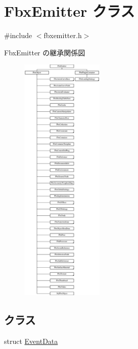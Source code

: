 \hypertarget{class_fbx_emitter}{}\section{Fbx\+Emitter クラス}
\label{class_fbx_emitter}


{\ttfamily \#include $<$fbxemitter.\+h$>$}

Fbx\+Emitter の継承関係図\begin{figure}[H]
\begin{center}
\leavevmode
\includegraphics[height=12.000000cm]{class_fbx_emitter}
\end{center}
\end{figure}
\subsection*{クラス}
\begin{DoxyCompactItemize}
\item 
struct \hyperlink{struct_fbx_emitter_1_1_event_data}{Event\+Data}
\end{DoxyCompactItemize}
